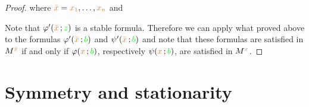 \begin{proof}

  where ${\color{brown}\bar x}={\color{brown} x_1},\dots,{\color{brown} x_n}$ and 



  Note that $\varphi'({\color{brown}\bar x}\,;{\color{green} z})$ is a stable formula.
  Therefore we can apply what proved above to the formulas $\varphi'({\color{brown}\bar x}\,;{\color{green} b})$ and $\psi'({\color{brown}\bar x}\,;{\color{green} b})$ and note that these formulas are satisfied in $M^{\color{brown}\bar x}$ if and only if $\varphi({\color{brown} x}\,;{\color{green} b})$, respectively $\psi({\color{brown} x}\,;{\color{green} b})$, are satisfied in $M^{\color{brown} x}$.
\end{proof}



\section{Symmetry and stationarity}\label{stationarity}

